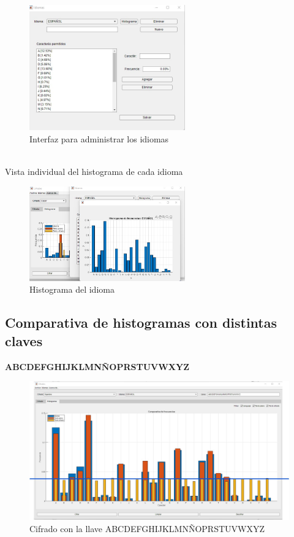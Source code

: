 \documentclass[10pt]{article}
\begin{document}
\begin{figure}[!ht]
  \centering
  \includegraphics[width=0.6\textwidth]{GUI_3}
  \caption{Interfaz para administrar los idiomas}
  \label{fig_sim}
\end{figure}
\\
Vista individual del histograma de cada idioma
\begin{figure}[!ht]
  \centering
  \includegraphics[width=0.6\textwidth]{GUI_4}
  \caption{Histograma del idioma}
  \label{fig_sim}
\end{figure}

\newpage

\subsection{Comparativa de histogramas con distintas claves}


\textbf{ABCDEFGHIJKLMNÑOPRSTUVWXYZ}
\begin{figure}[!ht]
  \centering
  \includegraphics[width=1\textwidth]{VigenereAlphabet.jpg}
  \caption{Cifrado con la llave ABCDEFGHIJKLMNÑOPRSTUVWXYZ}
  \label{fig_sim}
\end{figure}
\end{document}
